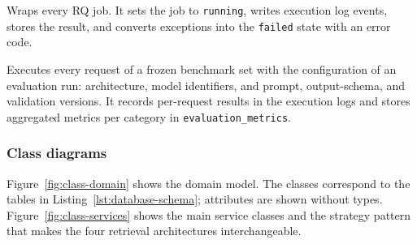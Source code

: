\documentclass[12pt,a4paper]{article}
\begin{document}
\begin{description}[style=nextline,leftmargin=0pt,labelindent=0pt]
\item[Job runner]
Wraps every RQ job. It sets the job to \texttt{running}, writes
execution log events, stores the result, and converts exceptions into
the \texttt{failed} state with an error code.

\item[Evaluation runner]
Executes every request of a frozen benchmark set with the
configuration of an evaluation run: architecture, model identifiers,
and prompt, output-schema, and validation versions. It records
per-request results in the execution logs and stores aggregated
metrics per category in \texttt{evaluation\_metrics}.

\end{description}

\subsubsection*{Class diagrams}

Figure~\ref{fig:class-domain} shows the domain model. The classes
correspond to the tables in Listing~\ref{lst:database-schema};
attributes are shown without types. Figure~\ref{fig:class-services}
shows the main service classes and the strategy pattern that makes
the four retrieval architectures interchangeable.
\end{document}
